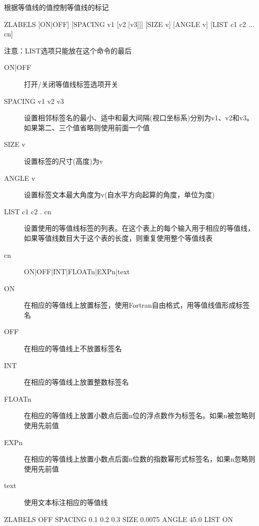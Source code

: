 \label{cmd:zlabels}

根据等值线的值控制等值线的标记

\begin{SACSTX}
ZLABELS [ON|OFF] [SPACING v1 [v2 [v3]]] [SIZE v]
    [ANGLE v] [LIST c1 c2 ... cn]
\end{SACSTX}
注意：LIST选项只能放在这个命令的最后

\begin{description}
\item [ON|OFF] 打开/关闭等值线标签选项开关
\item [SPACING v1 v2 v3] 设置相邻标签名的最小、适中和最大间隔(视口坐标系)分别为v1、v2和v3。如果第二、三个值省略则使用前面一个值
\item [SIZE v] 设置标签的尺寸(高度)为v
\item [ANGLE v] 设置标签文本最大角度为v(自水平方向起算的角度，单位为度)
\item [LIST c1 c2 . cn] 设置使用的等值线标签的列表。在这个表上的每个输入用于相应的等值线，如果等值线数目大于这个表的长度，则重复使用整个等值线表
\item [cn]  ON|OFF|INT|FLOATn|EXPn|text
\item [ON] 在相应的等值线上放置标签，使用Fortran自由格式，用等值线值形成标签名
\item [OFF] 在相应的等值线上不放置标签名
\item [INT] 在相应的等值线上放置整数标签名
\item [FLOATn] 在相应的等值线上放置小数点后面n位的浮点数作为标签名。如果n被忽略则使用先前值
\item [EXPn] 在相应的等值线上放置小数点后面n位数的指数幂形式标签名，如果n忽略则使用先前值
\item [text] 使用文本标注相应的等值线
\end{description}

\begin{SACDFT}
ZLABELS  OFF  SPACING 0.1 0.2 0.3  SIZE  0.0075 ANGLE 45.0  LIST ON
\end{SACDFT}

